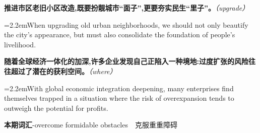 \documentclass[11pt,a4paper]{article}
\newcommand{\num}[1]{\makebox[1.9em][r]{#1.}\hspace{0.3em}}
\newcommand{\prompt}[1]{\emph{\textcolor{tipblue}{\small（#1）}}}
\begin{document}
\begin{minipage}{\linewidth}

\num{39}\textbf{推进市区老旧小区改造,既要扮靓城市“面子”,更要夯实民生“里子”。}\prompt{upgrade}

\vspace{0.15em}

\noindent\hangindent=2.2em\hspace{2.2em}When upgrading old urban neighborhoods, we should not only beautify the city’s appearance, but must also consolidate the foundation of people’s livelihood.

\end{minipage}

\begin{minipage}{\linewidth}

\num{40}\textbf{随着全球经济一体化的加深,许多企业发现自己正陷入一种境地:过度扩张的风险往往超过了潜在的获利空间。}\prompt{where}

\vspace{0.15em}

\noindent\hangindent=2.2em\hspace{2.2em}With global economic integration deepening, many enterprises find themselves trapped in a situation where the risk of overexpansion tends to outweigh the potential for profits.

\end{minipage}

\num{41}\textbf{本期词汇}\quad -overcome formidable obstacles　克服重重障碍
\end{document}
